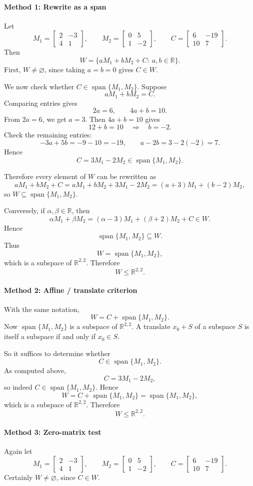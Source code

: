 \documentclass[12pt]{article}
\newcommand{\R}{\mathbb{R}}
\newcommand{\Span}{\operatorname{span}}
\begin{document}
\paragraph{Method 1: Rewrite as a span}
Let
\[
M_1=\begin{bmatrix}2&-3\\4&1\end{bmatrix},\qquad
M_2=\begin{bmatrix}0&5\\1&-2\end{bmatrix},\qquad
C=\begin{bmatrix}6&-19\\10&7\end{bmatrix}.
\]
Then
\[
W=\{aM_1+bM_2+C:\ a,b\in\R\}.
\]
First, \(W\neq\varnothing\), since taking \(a=b=0\) gives \(C\in W\).

We now check whether \(C\in \Span\{M_1,M_2\}\). Suppose
\[
aM_1+bM_2=C.
\]
Comparing entries gives
\[
2a=6,\qquad 4a+b=10.
\]
From \(2a=6\), we get \(a=3\). Then \(4a+b=10\) gives
\[
12+b=10 \quad\Rightarrow\quad b=-2.
\]
Check the remaining entries:
\[
-3a+5b=-9-10=-19,\qquad a-2b=3-2(-2)=7.
\]
Hence
\[
C=3M_1-2M_2\in \Span\{M_1,M_2\}.
\]

Therefore every element of \(W\) can be rewritten as
\[
aM_1+bM_2+C
=aM_1+bM_2+3M_1-2M_2
=(a+3)M_1+(b-2)M_2,
\]
so \(W\subseteq \Span\{M_1,M_2\}\).

Conversely, if \(\alpha,\beta\in\R\), then
\[
\alpha M_1+\beta M_2
=(\alpha-3)M_1+(\beta+2)M_2+C\in W.
\]
Hence
\[
\Span\{M_1,M_2\}\subseteq W.
\]
Thus
\[
W=\Span\{M_1,M_2\},
\]
which is a subspace of \(\R^{2,2}\). Therefore
\[
\boxed{W\le \R^{2,2}.}
\]

\paragraph{Method 2: Affine / translate criterion}
With the same notation,
\[
W=C+\Span\{M_1,M_2\}.
\]
Now \(\Span\{M_1,M_2\}\) is a subspace of \(\R^{2,2}\). A translate \(x_0+S\) of a subspace \(S\) is itself a subspace if and only if \(x_0\in S\).

So it suffices to determine whether
\[
C\in \Span\{M_1,M_2\}.
\]
As computed above,
\[
C=3M_1-2M_2,
\]
so indeed \(C\in \Span\{M_1,M_2\}\). Hence
\[
W=C+\Span\{M_1,M_2\}=\Span\{M_1,M_2\},
\]
which is a subspace of \(\R^{2,2}\). Therefore
\[
\boxed{W\le \R^{2,2}.}
\]

\paragraph{Method 3: Zero-matrix test}
Again let
\[
M_1=\begin{bmatrix}2&-3\\4&1\end{bmatrix},\qquad
M_2=\begin{bmatrix}0&5\\1&-2\end{bmatrix},\qquad
C=\begin{bmatrix}6&-19\\10&7\end{bmatrix}.
\]
Certainly \(W\neq\varnothing\), since \(C\in W\).
\end{document}

